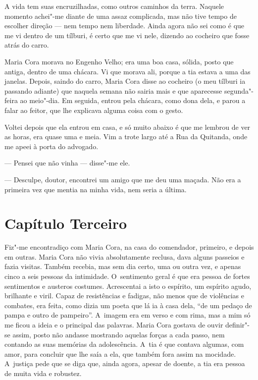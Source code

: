 \begin{linenumbers}
A vida tem suas encruzilhadas, como outros caminhos da terra. Naquele
momento achei"-me diante de uma assaz complicada, mas não tive tempo de
escolher direção --- nem tempo nem liberdade. Ainda agora não sei como é
que me vi dentro de um tílburi, é certo que me vi nele, dizendo ao
cocheiro que fosse atrás do carro.

Maria Cora morava no Engenho Velho; era uma boa casa, sólida, posto que
antiga, dentro de uma chácara. Vi que morava ali, porque a tia estava a
uma das janelas. Depois, saindo do carro, Maria Cora disse ao cocheiro
(o meu tílburi ia passando adiante) que naquela semana não sairia mais e
que aparecesse segunda"-feira ao meio"-dia. Em seguida, entrou pela
chácara, como dona dela, e parou a falar ao feitor, que lhe explicava
alguma coisa com o gesto.

Voltei depois que ela entrou em casa, e só muito abaixo é que me lembrou
de ver as horas, era quase uma e meia. Vim a trote largo até a Rua da
Quitanda, onde me apeei à porta do advogado.

--- Pensei que não vinha --- disse"-me ele.

--- Desculpe, doutor, encontrei um amigo que me deu uma maçada. Não era a
primeira vez que mentia na minha vida, nem seria a última.

\section{Capítulo Terceiro}

Fiz"-me encontradiço com Maria Cora, na casa do comendador, primeiro, e
depois em outras. Maria Cora não vivia absolutamente reclusa, dava
alguns passeios e fazia visitas. Também recebia, mas sem dia certo, uma
ou outra vez, e apenas cinco a seis pessoas da intimidade. O~sentimento
geral é que era pessoa de fortes sentimentos e austeros costumes.
Acrescentai a isto o espírito, um espírito agudo, brilhante e viril.
Capaz de resistências e fadigas, não menos que de violências e combates,
era feita, como dizia um poeta que lá ia à casa dela, ``de um pedaço de
pampa e outro de pampeiro''. A~imagem era em verso e com rima, mas a mim
só me ficou a ideia e o principal das palavras. Maria Cora gostava de
ouvir definir"-se assim, posto não andasse mostrando aquelas forças a
cada passo, nem contando as suas memórias da adolescência. A~tia é que
contava algumas, com amor, para concluir que lhe saía a ela, que também
fora assim na mocidade. A~justiça pede que se diga que, ainda agora,
apesar de doente, a tia era pessoa de muita vida e robustez.


\end{linenumbers}
